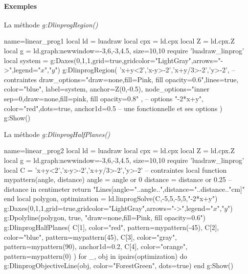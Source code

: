 \paragraph{Exemples}

\begin{demo}{La méthode \emph{g:DlinprogRegion()}}
\begin{luadraw}{name=linear_prog1}
local ld = luadraw
local cpx = ld.cpx
local Z = ld.cpx.Z
local g = ld.graph:new{window={-3,6,-3,4.5}, size={10,10}}
require 'luadraw_linprog'
local system = 
g:Daxes({0,1,1},{grid=true,gridcolor="LightGray",arrows="->",legend={"$x$","$y$"}})
g:DlinprogRegion(
    {'x+y<2','x-y>-2','x+y/3>-2','y>-2'}, -- contraintes
    {draw_options="draw=none,fill=Pink, fill opacity=0.6",lines=true, color="blue", label=system, anchor=Z(0,-0.5),
    node_options="inner sep=0,draw=none,fill=pink, fill opacity=0.8" }, -- options
    {"-2*x+y"}, {color="red",dots=true, anchor1d=0.5} -- une fonctionnelle et ses options
    )
g:Show()
\end{luadraw}
\end{demo}

\begin{demo}{La méthode \emph{g:DlinprogHalfPlanes()}}
\begin{luadraw}{name=linear_prog2}
local ld = luadraw
local cpx = ld.cpx
local Z = ld.cpx.Z
local g = ld.graph:new{window={-3,6,-3,4.5}, size={10,10}}
require 'luadraw_linprog'
local C = {'x+y<2','x-y>-2','x+y/3>-2','y>-2'} -- contraintes
local function mypattern(angle, distance)
    angle = angle or 0
    distance = distance or 0.25 -- distance in centimeter
    return "{Lines[angle="..angle..",distance="..distance.."cm]}"
end
local polygon, optimization = ld.linprogSolve(C,-5,5,-5,5,{"-2*x+y"})
g:Daxes({0,1,1},{grid=true,gridcolor="LightGray",arrows="->",legend={"$x$","$y$"}})
g:Dpolyline(polygon, true, "draw=none,fill=Pink, fill opacity=0.6")
g:DlinprogHalfPlanes(
    C[1], {color="red", pattern=mypattern(-45)},
    C[2], {color="blue", pattern=mypattern(45)},
    C[3], {color="gray", pattern=mypattern(90), anchor1d=0.2},
    C[4], {color="orange", pattern=mypattern(0)}
    )
for _, obj in ipairs(optimization) do
    g:DlinprogObjectiveLine(obj, {color="ForestGreen", dots=true})
end
g:Show()
\end{luadraw}
\end{demo}

